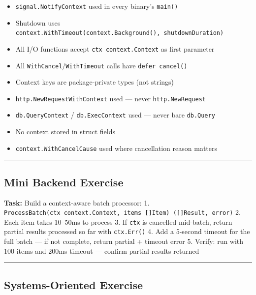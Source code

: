 \documentclass[11pt,a4paper,oneside]{book}
\providecommand{\tightlist}{\setlength{\itemsep}{0pt}\setlength{\parskip}{0pt}}
\begin{document}
\begin{itemize}
\tightlist
\item[$\square$]
  \texttt{signal.NotifyContext} used in every binary's \texttt{main()}
\item[$\square$]
  Shutdown uses
  \texttt{context.WithTimeout(context.Background(),\ shutdownDuration)}
\item[$\square$]
  All I/O functions accept \texttt{ctx\ context.Context} as first
  parameter
\item[$\square$]
  All \texttt{WithCancel}/\texttt{WithTimeout} calls have
  \texttt{defer\ cancel()}
\item[$\square$]
  Context keys are package-private types (not strings)
\item[$\square$]
  \texttt{http.NewRequestWithContext} used --- never
  \texttt{http.NewRequest}
\item[$\square$]
  \texttt{db.QueryContext} / \texttt{db.ExecContext} used --- never bare
  \texttt{db.Query}
\item[$\square$]
  No context stored in struct fields
\item[$\square$]
  \texttt{context.WithCancelCause} used where cancellation reason
  matters
\end{itemize}

\begin{center}\rule{0.5\linewidth}{0.5pt}\end{center}

\subsection{Mini Backend Exercise}

\textbf{Task:} Build a context-aware batch processor: 1.
\texttt{ProcessBatch(ctx\ context.Context,\ items\ {[}{]}Item)\ ({[}{]}Result,\ error)}
2. Each item takes 10--50ms to process 3. If \texttt{ctx} is cancelled
mid-batch, return partial results processed so far with
\texttt{ctx.Err()} 4. Add a 5-second timeout for the full batch --- if
not complete, return partial + timeout error 5. Verify: run with 100
items and 200ms timeout --- confirm partial results returned

\begin{center}\rule{0.5\linewidth}{0.5pt}\end{center}

\subsection{Systems-Oriented
Exercise}
\end{document}
